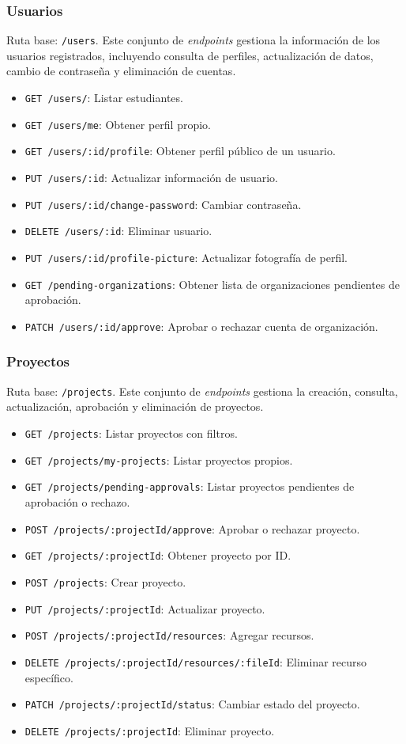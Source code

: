 \subsubsection{Usuarios}
Ruta base: \texttt{/users}. Este conjunto de \textit{endpoints} gestiona la información de los usuarios registrados,
incluyendo consulta de perfiles, actualización de datos, cambio de contraseña y eliminación de cuentas.
\begin{itemize}
    \item \texttt{GET /users/}: Listar estudiantes.
    \item \texttt{GET /users/me}: Obtener perfil propio.
    \item \texttt{GET /users/:id/profile}: Obtener perfil público de un usuario.
    \item \texttt{PUT /users/:id}: Actualizar información de usuario.
    \item \texttt{PUT /users/:id/change-password}: Cambiar contraseña.
    \item \texttt{DELETE /users/:id}: Eliminar usuario.
    \item \texttt{PUT /users/:id/profile-picture}: Actualizar fotografía de perfil.
    \item \texttt{GET /pending-organizations}: Obtener lista de organizaciones pendientes de aprobación.
    \item \texttt{PATCH /users/:id/approve}: Aprobar o rechazar cuenta de organización.
\end{itemize}

\subsubsection{Proyectos}
Ruta base: \texttt{/projects}. Este conjunto de \textit{endpoints} gestiona la creación, consulta, actualización,
aprobación y eliminación de proyectos.
\begin{itemize}
    \item \texttt{GET /projects}: Listar proyectos con filtros.
    \item \texttt{GET /projects/my-projects}: Listar proyectos propios.
    \item \texttt{GET /projects/pending-approvals}: Listar proyectos pendientes de aprobación o rechazo.
    \item \texttt{POST /projects/:projectId/approve}: Aprobar o rechazar proyecto.
    \item \texttt{GET /projects/:projectId}: Obtener proyecto por ID.
    \item \texttt{POST /projects}: Crear proyecto.
    \item \texttt{PUT /projects/:projectId}: Actualizar proyecto.
    \item \texttt{POST /projects/:projectId/resources}: Agregar recursos.
    \item \texttt{DELETE /projects/:projectId/resources/:fileId}: Eliminar recurso específico.
    \item \texttt{PATCH /projects/:projectId/status}: Cambiar estado del proyecto.
    \item \texttt{DELETE /projects/:projectId}: Eliminar proyecto.
\end{itemize}

